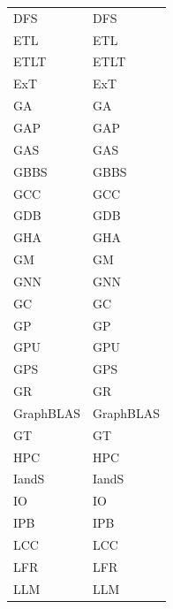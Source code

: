 \begin{supertabular}{ll}
    \acs{DFS}           &           \acl{DFS}           \\
    \acs{ETL}           &           \acl{ETL}           \\
    \acs{ETLT}          &           \acl{ETLT}          \\
    \acs{ExT}           &           \acl{ExT}           \\
    \acs{GA}            &           \acl{GA}            \\
    \acs{GAP}           &           \acl{GAP}           \\
    \acs{GAS}           &           \acl{GAS}           \\
    \acs{GBBS}          &           \acl{GBBS}          \\
    \acs{GCC}           &           \acl{GCC}           \\
    \acs{GDB}           &           \acl{GDB}           \\
    \acs{GHA}           &           \acl{GHA}           \\
    \acs{GM}            &           \acl{GM}            \\
    \acs{GNN}           &           \acl{GNN}           \\
    \acs{GC}            &           \acl{GC}            \\
    \acs{GP}            &           \acl{GP}            \\
    \acs{GPU}           &           \acl{GPU}           \\
    \acs{GPS}           &           \acl{GPS}           \\
    \acs{GR}            &           \acl{GR}            \\
    \acs{GraphBLAS}     &           \acl{GraphBLAS}         \\
    \acs{GT}            &           \acl{GT}            \\
    \acs{HPC}           &           \acl{HPC}           \\
    \acs{IandS}         &           \acl{IandS}         \\
    \acs{IO}            &           \acl{IO}            \\
    \acs{IPB}           &           \acl{IPB}           \\
    \acs{LCC}           &           \acl{LCC}           \\
    \acs{LFR}           &           \acl{LFR}           \\
    \acs{LLM}           &           \acl{LLM}           \\

\end{supertabular}

